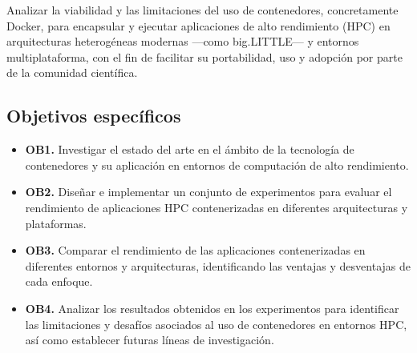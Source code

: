 Analizar la viabilidad y las limitaciones del uso de contenedores, concretamente Docker, para encapsular y ejecutar aplicaciones de alto rendimiento (HPC) en arquitecturas heterogéneas modernas —como big.LITTLE— y entornos multiplataforma, con el fin de facilitar su portabilidad, uso y adopción por parte de la comunidad científica.

\subsection{Objetivos específicos}\label{subsec:objetivos_especificos}

\begin{itemize}
   \item \textbf{OB1.} Investigar el estado del arte en el ámbito de la tecnología de contenedores y su aplicación en entornos de computación de alto rendimiento.
   \item \textbf{OB2.} Diseñar e implementar un conjunto de experimentos para evaluar el rendimiento de aplicaciones HPC contenerizadas en diferentes arquitecturas y plataformas.
   \item \textbf{OB3.} Comparar el rendimiento de las aplicaciones contenerizadas en diferentes entornos y arquitecturas, identificando las ventajas y desventajas de cada enfoque.
   \item \textbf{OB4.} Analizar los resultados obtenidos en los experimentos para identificar las limitaciones y desafíos asociados al uso de contenedores en entornos HPC, así como establecer futuras líneas de investigación.
\end{itemize}

